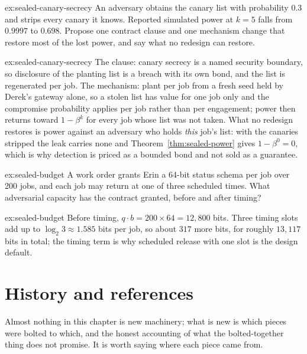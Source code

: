 \documentclass[11pt,a4paper]{article}
\theoremstyle{definition}
\begin{document}
\begin{pdexercise}[kind=Open,rating=3]{ex:sealed-canary-secrecy}
An adversary obtains the canary list with probability $0.3$ and strips every
canary it knows. Reported simulated power at $k=5$ falls from $0.9997$ to $0.698$.
Propose one contract clause and one mechanism change that restore most of the
lost power, and say what no redesign can restore.
\end{pdexercise}
\begin{pdsolution}{ex:sealed-canary-secrecy}
The clause: canary secrecy is a named security boundary, so disclosure of the
planting list is a breach with its own bond, and the list is regenerated per
job. The mechanism: plant per job from a fresh seed held by Derek's gateway
alone, so a stolen list has value for one job only and the compromise
probability applies per job rather than per engagement; power then returns
toward $1-\beta^k$ for every job whose list was not taken. What no redesign
restores is power against an adversary who holds \emph{this} job's list: with
the canaries stripped the leak carries none and Theorem~\ref{thm:sealed-power}
gives $1-\beta^0=0$, which is why detection is priced as a bounded bond and not
sold as a guarantee.
\end{pdsolution}

\begin{pdexercise}[kind=Check,rating=1]{ex:sealed-budget}
A work order grants Erin a 64-bit status schema per job over 200 jobs, and each
job may return at one of three scheduled times. What adversarial capacity has
the contract granted, before and after timing?
\end{pdexercise}
\begin{pdsolution}{ex:sealed-budget}
Before timing, $q\cdot b=200\times64=12{,}800$ bits. Three timing slots add up
to $\log_2 3\approx1.585$ bits per job, so about $317$ more bits, for roughly
$13{,}117$ bits in total; the timing term is why scheduled release with one
slot is the design default.
\end{pdsolution}

\section{History and references}
\label{sec:sealed-history}

Almost nothing in this chapter is new machinery; what is new is which pieces
were bolted to which, and the honest accounting of what the bolted-together
thing does not promise. It is worth saying where each piece came from.
\end{document}

